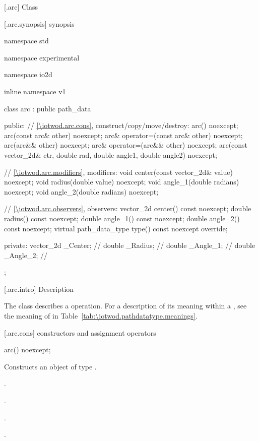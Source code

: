  [\iotwod.arc] {Class }

 [\iotwod.arc.synopsis] { synopsis}

\begin{codeblock}
namespace std { namespace experimental { namespace io2d { inline namespace v1 {
  class arc : public path_data {
  public:
    // \ref{\iotwod.arc.cons}, construct/copy/move/destroy:
    arc() noexcept;
    arc(const arc& other) noexcept;
    arc& operator=(const arc& other) noexcept;
    arc(arc&& other) noexcept;
    arc& operator=(arc&& other) noexcept;
    arc(const vector_2d& ctr, double rad, double angle1, double angle2) noexcept;

    // \ref{\iotwod.arc.modifiers}, modifiers:
    void center(const vector_2d& value) noexcept;
    void radius(double value) noexcept;
    void angle_1(double radians) noexcept;
    void angle_2(double radians) noexcept;

    // \ref{\iotwod.arc.observers}, observers:
    vector_2d center() const noexcept;
    double radius() const noexcept;
    double angle_1() const noexcept;
    double angle_2() const noexcept;
    virtual path_data_type type() const noexcept override;

  private:
    vector_2d _Center; // \expos
    double _Radius;    // \expos
    double _Angle_1;   // \expos
    double _Angle_2;   // \expos
  };
} } } }
\end{codeblock}

 [\iotwod.arc.intro] { Description}

\pnum
{}
The class  describes a  operation. For a description of its meaning within a , see the meaning of  in Table~\ref{tab:\iotwod.pathdatatype.meanings}.

 [\iotwod.arc.cons] { constructors and assignment operators}

\begin{itemdecl}
    arc() noexcept;
\end{itemdecl}
\begin{itemdescr}
	\pnum
	\effects
	Constructs an object of type .
	
	\pnum
	\postconditions
	.

	.

	.

	.

\end{itemdescr}

